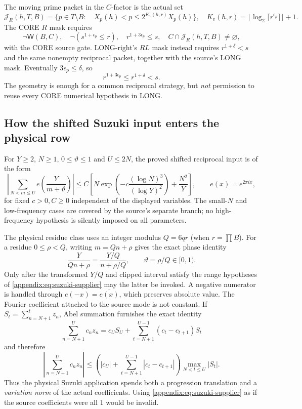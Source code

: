 \documentclass[11pt]{article}
\newcommand{\JR}{\mathcal J_R}
\newcommand{\epsp}{\epsilon_p}
\theoremstyle{definition}
\theoremstyle{remark}
\newcommand{\1}{\mathbf 1}
\begin{document}
The moving prime packet in the $C$-factor is the actual set
\begin{equation}\label{eq:Rpacket}
 \JR(h,T,B)=\{p\in T\setminus B:\quad
 X_p(h)<p\le2^{K_v(h,r)}X_p(h)\},
 \quad K_v(h,r)=\lfloor\log_2\lceil r^{\epsp}\rceil\rfloor+1.
\end{equation}
The CORE $R$ mask requires
\[
 \neg\mathsf W(B,C),\quad
 \neg(s^{1+\epsp}\le r),\quad
 r^{1+3\epsp}\le s,\quad
 C\cap\JR(h,T,B)\ne\varnothing,
\]
with the CORE source gate. LONG-right's $RL$ mask instead
requires $r^{1+\delta}<s$ and the same nonempty reciprocal
packet, together with the source's LONG mask. Eventually
$3\epsp\le\delta$, so
\begin{equation}\label{eq:RL-geometry}
 r^{1+3\epsp}\le r^{1+\delta}<s.
\end{equation}
The geometry is enough for a common reciprocal strategy,
but \emph{not} permission to reuse every CORE numerical
hypothesis in LONG.

\subsection{How the shifted Suzuki input enters the physical row}

For $Y\ge2$, $N\ge1$, $0\le\vartheta\le1$ and $U\le2N$,
the proved shifted reciprocal input is of the form
\begin{equation}\label{appendix:eq:suzuki-supplier}
 \left|\sum_{N<m\le U}e\left(\frac{Y}{m+\vartheta}\right)\right|
 \le C\left[N\exp\left(-c\frac{(\log N)^3}{(\log Y)^2}\right)
            +\frac{N^2}{Y}\right],\qquad e(x)=e^{2\pi ix},
\end{equation}
for fixed $c>0,C\ge0$ independent of the displayed
variables. The small-$N$ and low-frequency cases are
covered by the source's separate branch; no high-frequency
hypothesis is silently imposed on all parameters.

The physical residue class uses an integer modulus $Q=6qr$
(when $r=\prod B$). For a residue $0\le\rho<Q$,
writing $m=Qn+\rho$ gives the exact phase identity
\begin{equation}\label{eq:ap-phase}
 \frac{Y}{Qn+\rho}=
 \frac{Y/Q}{n+\rho/Q},\qquad
 \vartheta=\rho/Q\in[0,1).
\end{equation}
Only after the transformed $Y/Q$ and clipped interval satisfy
the range hypotheses of \eqref{appendix:eq:suzuki-supplier} may the
latter be invoked. A negative numerator is handled through
$e(-x)=\overline{e(x)}$, which preserves absolute value.
The Fourier coefficient attached to the source mode is
not constant. If $S_t=\sum_{n=N+1}^t z_n$, Abel summation
furnishes the exact identity
\[
 \sum_{n=N+1}^{U}c_nz_n
 =c_US_U+\sum_{t=N+1}^{U-1}(c_t-c_{t+1})S_t
\]
and therefore
\begin{equation}\label{eq:abel-cost}
 \left|\sum_{n=N+1}^{U}c_nz_n\right|
 \le \left(|c_U|+\sum_{t=N+1}^{U-1}|c_t-c_{t+1}|\right)
     \max_{N<t\le U}|S_t|.
\end{equation}
Thus the physical Suzuki application spends both a
progression translation and a \emph{variation norm} of the
actual coefficients. Using \eqref{appendix:eq:suzuki-supplier} as if
the source coefficients were all $1$ would be invalid.
\end{document}
